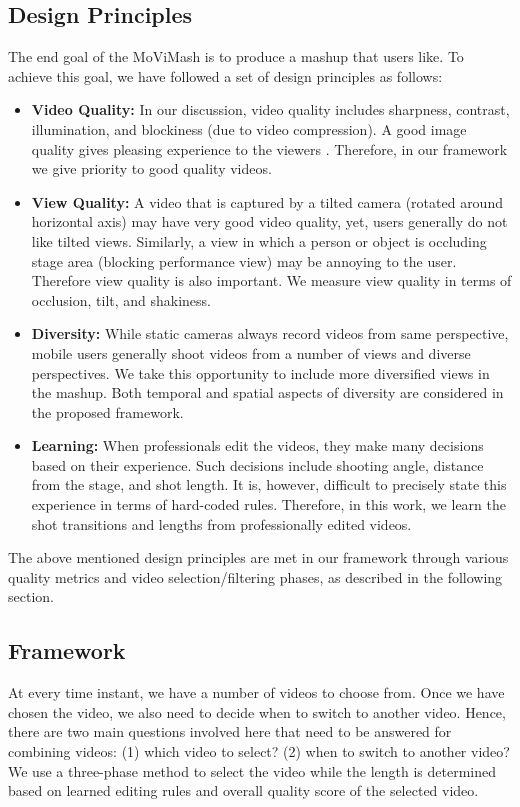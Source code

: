 \documentclass{sig-alternate}
\begin{document}
\subsection{Design Principles}
The end goal of the MoViMash is to produce a mashup that users
like. To achieve this goal, we have followed a set of design principles as follows:
 \begin{itemize} 
    \item \textbf{Video Quality:} In our discussion, video quality includes sharpness, contrast, illumination, and blockiness (due to video compression). A good image quality gives pleasing experience to the viewers \cite{10}. Therefore, in our framework we give priority to good quality videos.
    \item \textbf{View Quality:} A video that is captured by a tilted camera (rotated around horizontal axis) may have very good video quality, yet, users generally do not like tilted views. Similarly, a view in which a person or object is occluding stage area (blocking performance view) may be annoying to the user. Therefore view quality is also important. We measure view quality in terms of occlusion, tilt, and shakiness.
    \item \textbf{Diversity:} While static cameras always record videos from same perspective, mobile users generally shoot videos from a number of views and diverse perspectives. We take this opportunity to include more diversified views in the mashup. Both temporal and spatial aspects of diversity are considered in the proposed framework.
    \item \textbf{Learning:} When professionals edit the videos, they make many decisions based on their experience. Such decisions include shooting angle, distance from the stage, and shot length. It is, however, difficult to precisely state this experience in terms of hard-coded rules. Therefore, in this work, we learn the shot transitions and lengths from professionally edited videos.
 \end{itemize} 
The above mentioned design principles are met in our framework through various quality metrics and video selection/filtering phases, as described in the following section.

\subsection{Framework}
At every time instant, we have a number of videos to choose from. Once we have chosen the video, we also need to decide when to switch to another video. Hence, there are two main questions involved here that need to be answered for combining videos: (1) which video to select? (2) when to switch to another video? We use a three-phase method to select the video while the length is determined based on learned editing rules and overall quality score of the selected video.
\end{document}
